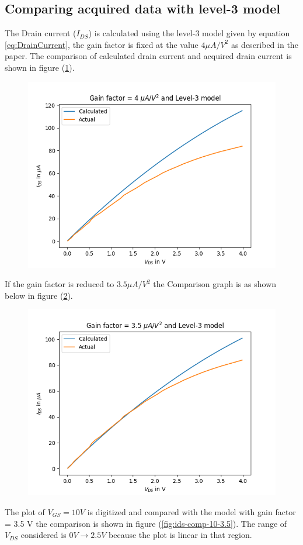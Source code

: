 \documentclass{article}
\begin{document}
\subsection*{Comparing acquired data with level-3 model}
The Drain current ($I_{DS}$) is calculated using the level-3 model given by equation \ref{eq:DrainCurrent}, the gain factor is fixed at the value $4 \mu A/V^2$ as described in the paper. The comparison of calculated drain current and acquired drain current is shown in figure (\ref{fig:ids-comp-4}).
\begin{figure}
    \label{fig:ids-comp-4}
    \includegraphics[scale = 0.6]{../Images/Previous/Ids-comp.png}    
\end{figure}


If the gain factor is reduced to $3.5 \mu A / V^2$ the Comparison graph is as shown below in figure (\ref{fig:ids-comp-3.5}). 
\begin{figure}
    \label{fig:ids-comp-3.5}
    \includegraphics[scale = 0.6]{../Images/Previous/Ids-comp-3.5.png}

\end{figure}
The plot of $V_{GS} = 10 V$ is digitized and compared with the model with gain factor = 3.5 V the comparison is shown in figure (\ref{fig:ids-comp-10-3.5}). The range of $V_{DS}$ considered is $0 V \to 2.5 V$ because the plot is linear in that region. 
\end{document}
